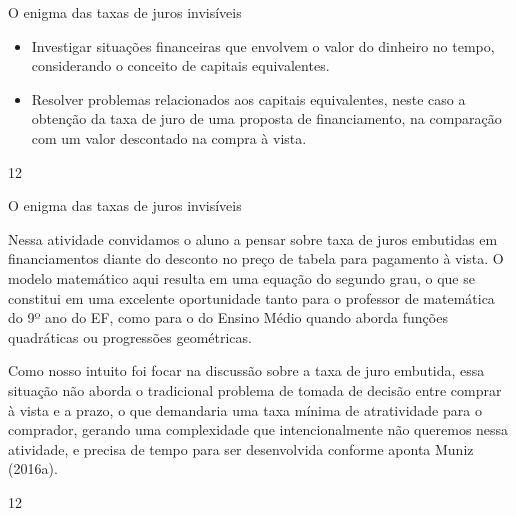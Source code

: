 \begin{objectives}{O enigma das taxas de juros invisíveis}
{
\begin{itemize}
\item Investigar situações financeiras que envolvem o valor do dinheiro no tempo, considerando o conceito de capitais equivalentes. 
\item Resolver problemas relacionados aos capitais equivalentes, neste caso a obtenção da taxa de juro de uma proposta de financiamento, na comparação com um valor descontado na compra à vista.
\end{itemize}
}{1}{2}
\end{objectives}
\begin{sugestions}{O enigma das taxas de juros invisíveis}
{
Nessa atividade convidamos o aluno a pensar sobre taxa de juros embutidas em financiamentos diante do desconto no preço de tabela para pagamento à vista. O modelo matemático aqui resulta em uma equação do segundo grau, o que se constitui em uma excelente oportunidade tanto para o professor de matemática do 9º ano do EF, como para o do Ensino Médio quando aborda funções quadráticas ou progressões geométricas. 

Como nosso intuito foi focar na discussão sobre a taxa de juro embutida, essa situação não aborda o tradicional problema de tomada de decisão entre comprar à vista e a prazo, o que demandaria uma taxa mínima de atratividade para o comprador, gerando uma complexidade que intencionalmente não queremos nessa atividade, e precisa de tempo para ser desenvolvida conforme aponta Muniz (2016a).

}{1}{2}
\end{sugestions}
